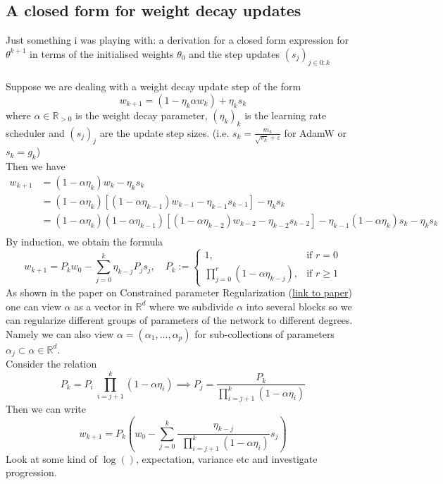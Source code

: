 \documentclass[12pt]{book}
\newcommand{\R}{\mathbb{R}}
\begin{document}
\subsection*{A closed form for weight decay updates}
Just something i was playing with: a derivation for a closed form expression for  $\theta^{k+1}$ in terms of the initialised weights $\theta_0$ and the step updates $(s_{j})_{j \in 0: k} $
\\\\
Suppose we are dealing with a weight decay update step of the form 
\[
w_{k+1}  = (1-\eta_k \alpha w_k) + \eta_k s_k 
\] 
where $\alpha\in\R_{>0}$ is the weight decay parameter, $(\eta_{k})_{k} $ is the learning rate scheduler and  $(s_{j})_{j} $ are the update step sizes. (i.e. $s_k = \frac{m_k}{\sqrt{v_k} + \varepsilon }$ for AdamW or $s_k = g_k$)
\\
Then we have 
\begin{align*}
	w_{k+1} &= (1-\alpha\eta_k )w_{k} -\eta_k s_k\\
&= (1-\alpha\eta_k) [(1-\alpha\eta_{k-1})w_{k-1} - \eta_{k-1}s_{k-1}] -\eta_ks_k\\
&= (1-\alpha\eta_k)(1-\alpha\eta_{k-1})[(1-\alpha\eta_{k-2})w_{k-2} - \eta_{k-2}s_{k-2}] - \eta_{k-1}(1-\alpha\eta_k)s_k - \eta_k s_k\\
\end{align*}
By induction, we obtain the formula
\[
w_{k+1} = P_k w_0 - \sum_{j=0}^{k} {\eta_{k-j}P_js_j}, \quad P_k := \begin{cases}
	1, & \text{if $r = 0$}\\
	\displaystyle\prod_{j=0}^{r} (1-\alpha\eta_{k-j} ), & \text{if $r\ge 1$}
\end{cases}
\] 
As shown in the paper on Constrained parameter Regularization (\href{https://openreview.net/pdf?id=rCXTkIhkbF}{link to paper}) one can view $\alpha$ as a vector in $\R^{d}$ where we subdivide $\alpha$ into several blocks so we can regularize different groups of parameters of the network to different degrees. Namely we can also view $\alpha = (\alpha_1, \ldots, \alpha_p)$ for sub-collections of parameters $\alpha_j \subset \alpha \in \R^{d}$. 
\\
Consider the relation 
\[
P_k = P_i \  \displaystyle\prod_{i=j+1}^{k} ( 1 - \alpha\eta_i) \implies P_j = \frac{P_k}{\prod_{i=j+1}^{k} (1-\alpha\eta_i)}
\] 
Then we can write 
\[
	w_{k+1} = P_k\left(w_0 - \sum_{j=0}^{k} {\frac{\eta_{k-j}}{\ \ \prod_{i=j+1}^{k} (1-\alpha\eta_i)}s_j}\right)
\] 
Look at some kind of $\log()$, expectation, variance etc and investigate progression. 
\end{document}
